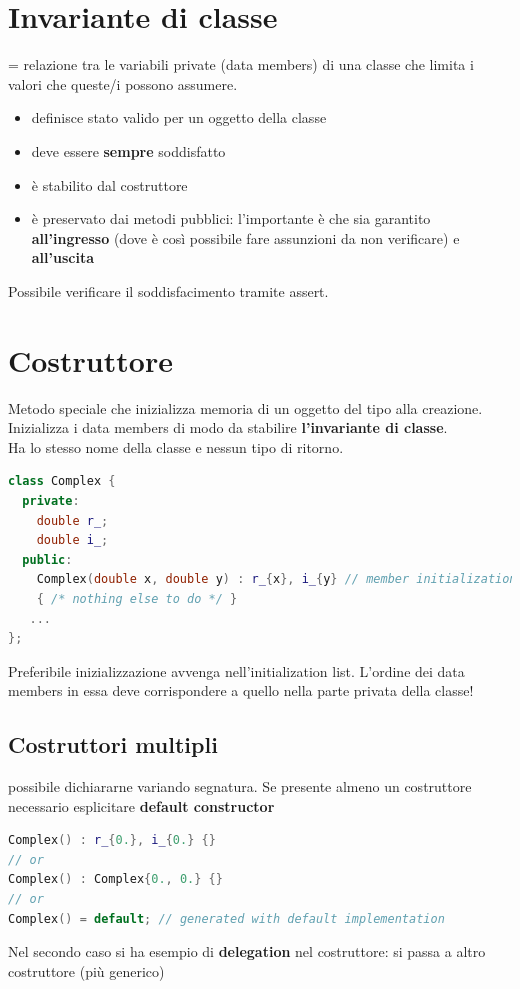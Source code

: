 \documentclass[10pt, oneside]{book}
\begin{document}
\section{Invariante di classe}
= relazione tra le variabili private (data members) di una classe che limita i valori che queste/i possono assumere.
\begin{itemize}
\item definisce stato valido per un oggetto della classe
\item deve essere \textbf{sempre} soddisfatto
\item è stabilito dal costruttore
\item è preservato dai metodi pubblici: l'importante è che sia garantito \textbf{all'ingresso} (dove è così possibile fare assunzioni da non verificare) e \textbf{all'uscita}
\end{itemize}
Possibile verificare il soddisfacimento tramite assert.

\section{Costruttore}
Metodo speciale che inizializza memoria di un oggetto del tipo alla creazione. Inizializza i data members di modo da stabilire \textbf{l'invariante di classe}.\\
Ha lo stesso nome della classe e nessun tipo di ritorno.
\begin{lstlisting}[language=C++]
class Complex {
  private:
    double r_;
    double i_;
  public:
    Complex(double x, double y) : r_{x}, i_{y} // member initialization list
    { /* nothing else to do */ }
   ...
};
\end{lstlisting}
Preferibile inizializzazione avvenga nell'initialization list. L'ordine dei data members in essa deve corrispondere a quello nella parte privata della classe!

\subsection{Costruttori multipli} possibile dichiararne variando segnatura. Se presente almeno un costruttore necessario esplicitare \textbf{default constructor}
\begin{lstlisting}[language=C++]
Complex() : r_{0.}, i_{0.} {}
// or
Complex() : Complex{0., 0.} {}
// or
Complex() = default; // generated with default implementation 
\end{lstlisting}
Nel secondo caso si ha esempio di \textbf{delegation} nel costruttore: si passa a altro costruttore (più generico)
\end{document}
